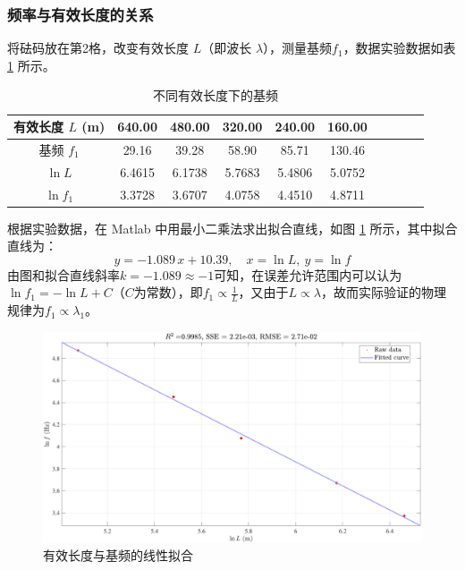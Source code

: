 \documentclass[UTF8]{article}
\theoremstyle{MyLineTheoremStyle} %
\theoremstyle{MyBlockTheoremStyle} %
\theoremstyle{MySubsubsectionStyle} %
\begin{document}
\subsubsection{频率与有效长度的关系}
将砝码放在第2格，改变有效长度 $L$（即波长 $\lambda$），测量基频$ f_1 $，数据实验数据如表 \ref{不同有效长度下的基频} 所示。
\begin{table}[H]\centering
    \caption{不同有效长度下的基频}
    \label{不同有效长度下的基频}
\begin{tabular}{cccccccccc}\toprule
    有效长度 $L$ (m) & 640.00 & 480.00 & 320.00 & 240.00 & 160.00 \\
    \midrule
    基频 $f_1$ & 29.16  & 39.28  & 58.90  & 85.71  & 130.46 \\
    $\ln L$ & 6.4615  &  6.1738  &  5.7683  &  5.4806  &  5.0752 \\
    $\ln f_1$ & 3.3728  &  3.6707  &  4.0758  &  4.4510  &  4.8711 \\
    \bottomrule
\end{tabular}
\end{table}
根据实验数据，在 Matlab 中用最小二乘法求出拟合直线，如图 \ref{有效长度与基频的线性拟合} 所示，其中拟合直线为：
\begin{equation}
y = -1.089 \,x + 10.39,\quad x = \ln L,\ y = \ln f
\end{equation}
由图和拟合直线斜率$ k=-1.089\approx-1 $可知，在误差允许范围内可以认为$ \ln f_1=-\ln L+C $（$ C $为常数），即$ f_1\propto\frac1L $，又由于$ L\propto\lambda $，故而实际验证的物理规律为$ f_1\propto\lambda_1 $。



\begin{figure}[H]\centering
    \includegraphics[width=0.9\columnwidth]{assets/3.pdf}
    \caption{有效长度与基频的线性拟合}
    \label{有效长度与基频的线性拟合}
\end{figure}
\end{document}
